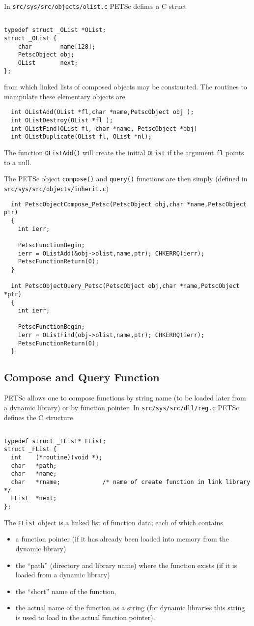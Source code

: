 \documentclass[twoside,12pt]{../sty/report_petsc}
\begin{document}
In {\tt src/sys/src/objects/olist.c} PETSc defines a C struct
\begin{verbatim}

typedef struct _OList *OList;
struct _OList {
    char        name[128];
    PetscObject obj;
    OList       next;
};
\end{verbatim}
from which linked lists of composed objects may be constructed. The routines
to manipulate these elementary objects are
\begin{verbatim}
  int OListAdd(OList *fl,char *name,PetscObject obj );
  int OListDestroy(OList *fl );
  int OListFind(OList fl, char *name, PetscObject *obj)
  int OListDuplicate(OList fl, OList *nl);
\end{verbatim}
The function {\tt OListAdd()} will create the initial {\tt OList} if the argument 
{\tt fl} points to a null.

The PETSc object {\tt compose()} and {\tt query()} functions are then simply
(defined in {\tt src/sys/src/objects/inherit.c})
\begin{verbatim}
  int PetscObjectCompose_Petsc(PetscObject obj,char *name,PetscObject ptr)
  {
    int ierr;

    PetscFunctionBegin;
    ierr = OListAdd(&obj->olist,name,ptr); CHKERRQ(ierr);
    PetscFunctionReturn(0);
  }

  int PetscObjectQuery_Petsc(PetscObject obj,char *name,PetscObject *ptr)
  {
    int ierr;

    PetscFunctionBegin;
    ierr = OListFind(obj->olist,name,ptr); CHKERRQ(ierr);
    PetscFunctionReturn(0); 
  }
\end{verbatim}

\subsection{Compose and Query Function}

PETSc allows one to compose functions by string name (to be loaded later from 
a dynamic library) or by function pointer. In {\tt src/sys/src/dll/reg.c}
PETSc defines the C structure

\begin{verbatim}

typedef struct _FList* FList;
struct _FList {
  int    (*routine)(void *);
  char   *path;
  char   *name;               
  char   *rname;            /* name of create function in link library */
  FList  *next;
};
\end{verbatim}

The {\tt FList} object is a linked list of function data; each 
of which contains
\begin{itemize}
\item a function pointer (if it has already been loaded into memory from the dynamic library)
\item the ``path'' (directory and library name) where the function exists (if it is 
      loaded from a dynamic library)
\item the ``short'' name of the function,
\item the actual name of the function as a string (for dynamic libraries this string is used
      to load in the actual function pointer).
\end{itemize}
\end{document}
